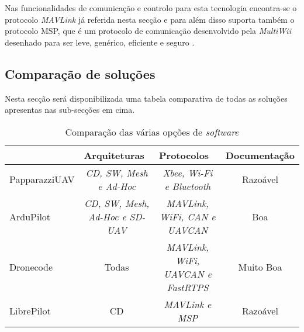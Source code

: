 Nas funcionalidades de comunicação e controlo para esta tecnologia encontra-se o protocolo \textit{MAVLink} já referida nesta secção e para além disso suporta também o protocolo MSP, que é um protocolo de comunicação desenvolvido pela \textit{MultiWii} desenhado para ser leve, genérico, eficiente e seguro \cite{MultiWii,MultiWiiForum}. 

\subsection{Comparação de soluções}

Nesta secção será disponibilizada uma tabela comparativa de todas as soluções apresentas nas sub-secções em cima.


\begin{table}[H]
\caption{Comparação das várias opções de \textit{software}}
\begin{tabular}{l|c|c|c|}
\cline{2-4}
& \multicolumn{1}{l|}{Arquiteturas}  & \multicolumn{1}{l|}{Protocolos}  & \multicolumn{1}{l|}{Documentação} \\ \hline
\multicolumn{1}{|l|}{PapparazziUAV} & \textit{CD, SW, Mesh e Ad-Hoc}  & \textit{Xbee, Wi-Fi e Bluetooth} & Razoável \\ \hline
\multicolumn{1}{|l|}{ArduPilot}     & \textit{CD, SW, Mesh, Ad-Hoc e SD-UAV} & \textit{MAVLink, WiFi, CAN e UAVCAN}      & Boa                               \\ \hline
\multicolumn{1}{|l|}{Dronecode}     & Todas                                  & \textit{MAVLink, WiFi, UAVCAN e FastRTPS} & Muito Boa                         \\ \hline
\multicolumn{1}{|l|}{LibrePilot}    & CD                       & \textit{MAVLink e MSP}                    & Razoável                          \\ \hline
\end{tabular}
\end{table}



